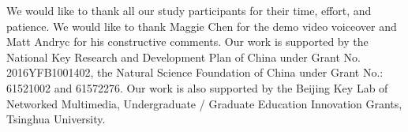 \begin{acknowledgement}
    We would like to thank all our study participants for their time, effort, and patience. We would like to thank Maggie Chen for the demo video voiceover and Matt Andryc for his constructive comments. Our work is supported by the National Key Research and Development Plan of China under Grant No. 2016YFB1001402, the Natural Science Foundation of China under Grant No.: 61521002 and 61572276. Our work is also supported by the Beijing Key Lab of Networked Multimedia,  Undergraduate / Graduate Education Innovation Grants, Tsinghua University.
\end{acknowledgement}
